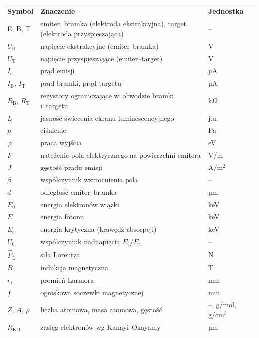 \begin{tabular}{@{}lp{}l@{}}
\toprule
\textbf{Symbol} & \textbf{Znaczenie} & \textbf{Jednostka} \\
\midrule
E, B, T                 & emiter, bramka (elektroda ekstrakcyjna), target (elektroda przyspieszająca) & -- \\
$U_\mathrm{B}$          & napięcie ekstrakcyjne (emiter--bramka) & V \\
$U_\mathrm{T}$          & napięcie przyspieszające (emiter--target) & V \\
$I_\mathrm{e}$          & prąd emisji & µA \\
$I_\mathrm{B}$, $I_\mathrm{T}$ & prąd bramki, prąd targetu & µA \\
$R_\mathrm{B}$, $R_\mathrm{T}$ & rezystory ograniczające w~obwodzie bramki i~targetu & k$\Omega$ \\
$L$                     & jasność świecenia ekranu luminescencyjnego & j.u. \\
$p$                     & ciśnienie & Pa \\
$\varphi$               & praca wyjścia & eV \\
$F$                     & natężenie pola elektrycznego na powierzchni emitera & V/m \\
$J$                     & gęstość prądu emisji & A/m$^2$ \\
$\beta$                 & współczynnik wzmocnienia pola & -- \\
$d$                     & odległość emiter--bramka & µm \\
$E_0$                   & energia elektronów wiązki & keV \\
$E$                     & energia fotonu & keV \\
$E_\mathrm{c}$          & energia krytyczna (krawędź absorpcji) & keV \\
$U_0$                   & współczynnik nadnapięcia $E_0/E_\mathrm{c}$ & -- \\
$\vec F_\mathrm{L}$     & siła Lorentza & N \\
$B$                     & indukcja magnetyczna & T \\
$r_\mathrm{L}$          & promień Larmora & mm \\
$f$                     & ogniskowa soczewki magnetycznej & mm \\
$Z$, $A$, $\rho$        & liczba atomowa, masa atomowa, gęstość & --, g/mol, g/cm$^3$ \\
$R_\mathrm{KO}$         & zasięg elektronów wg Kanayi--Okayamy & µm \\

\end{tabular}
